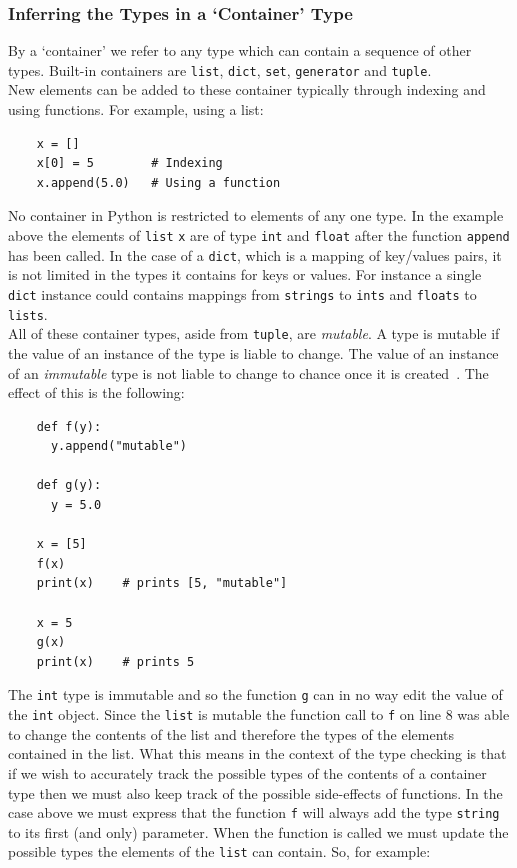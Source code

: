 \documentclass[12pt, titlepage]{article}
\begin{document}
\subsubsection{Inferring the Types in a `Container' Type}
\label{chap:inferringContainers}
By a `container' we refer to any type which can contain a sequence of other types. Built-in containers are \texttt{list}, \texttt{dict}, \texttt{set}, \texttt{generator} and \texttt{tuple}. \\
\indent New elements can be added to these container typically through indexing and using functions. For example, using a list:
\begin{lstlisting}
    x = []
    x[0] = 5        # Indexing
    x.append(5.0)   # Using a function
\end{lstlisting}
No container in Python is restricted to elements of any one type. In the example above the elements of \texttt{list} \texttt{x} are of type \texttt{int} and \texttt{float} after the function \texttt{append} has been called. In the case of a \texttt{dict}, which is a mapping of key/values pairs, it is not limited in the types it contains for keys or values. For instance a single \texttt{dict} instance could contains mappings from \texttt{strings} to \texttt{ints} and \texttt{floats} to \texttt{lists}. \\
\indent All of these container types, aside from \texttt{tuple}, are \textit{mutable}. A type is mutable if the value of an instance of the type is liable to change. The value of an instance of an \textit{immutable} type is not liable to change to chance once it is created~\cite{pythonMutable}. The effect of this is the following:
\begin{lstlisting}
    def f(y):
      y.append("mutable")
     
    def g(y):
      y = 5.0
      
    x = [5]
    f(x)
    print(x)    # prints [5, "mutable"]
    
    x = 5
    g(x)
    print(x)    # prints 5
\end{lstlisting}
The \texttt{int} type is immutable and so the function \texttt{g} can in no way edit the value of the \texttt{int} object. Since the \texttt{list} is mutable the function call to \texttt{f} on line 8 was able to change the contents of the list and therefore the types of the elements contained in the list. What this means in the context of the type checking is that if we wish to accurately track the possible types of the contents of a container type then we must also keep track of the possible side-effects of functions. In the case above we must express that the function \texttt{f} will always add the type \texttt{string} to its first (and only) parameter. When the function is called we must update the possible types the elements of the \texttt{list} can contain. So, for example:
\end{document}
